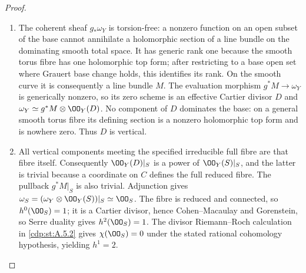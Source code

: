 \begin{proof}

\begin{enumerate}[label={$\langle1\rangle$\arabic*.},leftmargin=*]
\item The coherent sheaf $g_*\omega_Y$ is torsion-free: a nonzero function on an open subset of the base cannot annihilate a holomorphic section of a line bundle on the dominating smooth total space. It has generic rank one because the smooth torus fibre has one holomorphic top form; after restricting to a base open set where Grauert base change holds, this identifies its rank. On the smooth curve it is consequently a line bundle $M$. The evaluation morphism $g^*M\to\omega_Y$ is generically nonzero, so its zero scheme is an effective Cartier divisor $D$ and $\omega_Y\simeq g^*M\otimes\OO_Y(D)$. No component of $D$ dominates the base: on a general smooth torus fibre its defining section is a nonzero holomorphic top form and is nowhere zero. Thus $D$ is vertical.

\item All vertical components meeting the specified irreducible full fibre are that fibre itself. Consequently $\OO_Y(D)|_S$ is a power of $\OO_Y(S)|_S$, and the latter is trivial because a coordinate on $C$ defines the full reduced fibre. The pullback $g^*M|_S$ is also trivial. Adjunction gives $\omega_S=(\omega_Y\otimes\OO_Y(S))|_S\simeq\OO_S$. The fibre is reduced and connected, so $h^0(\OO_S)=1$; it is a Cartier divisor, hence Cohen--Macaulay and Gorenstein, so Serre duality gives $h^2(\OO_S)=1$. The divisor Riemann--Roch calculation in \ref{cdp:st:A.5.2} gives $\chi(\OO_S)=0$ under the stated rational cohomology hypothesis, yielding $h^1=2$.

\end{enumerate}
\end{proof}
